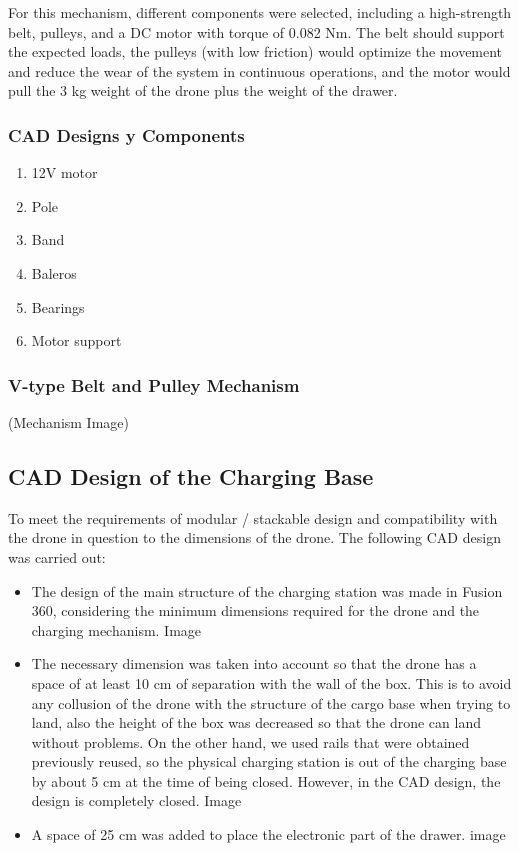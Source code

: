For this mechanism, different components were selected, including a high-strength belt, pulleys, and a DC motor with torque of 0.082 Nm. The belt should support the expected loads, the pulleys (with low friction) would optimize the movement and reduce the wear of the system in continuous operations, and the motor would pull the 3 kg weight of the drone plus the weight of the drawer.
    \subsubsection{CAD Designs y Components}
        \begin{enumerate}
            \item 12V motor
            \item Pole
            \item Band
            \item Baleros
            \item Bearings 
            \item Motor support
        \end{enumerate}

    \subsubsection{V-type Belt and Pulley Mechanism}
    (Mechanism Image)

    \subsection{CAD Design of the Charging Base}
    To meet the requirements of modular / stackable design and compatibility with the drone in question to the dimensions of the drone. The following CAD design was carried out:

        \begin{itemize}
            \item     The design of the main structure of the charging station was made in Fusion 360, considering the minimum dimensions required for the drone and the charging mechanism.
            Image
            \item     The necessary dimension was taken into account so that the drone has a space of at least 10 cm of separation with the wall of the box. This is to avoid any collusion of the drone with the structure of the cargo base when trying to land, also the height of the box was decreased so that the drone can land without problems. On the other hand, we used rails that were obtained previously reused, so the physical charging station is out of the charging base by about 5 cm at the time of being closed. However, in the CAD design, the design is completely closed. 
            Image
            \item     A space of 25 cm was added to place the electronic part of the drawer.
            image
        \end{itemize}



